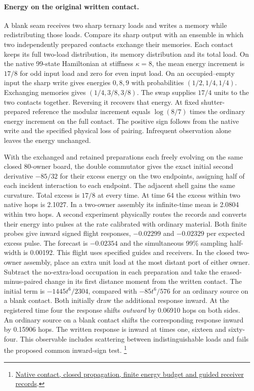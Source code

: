 \documentclass[11pt]{article}
\begin{document}
\paragraph{Energy on the original written contact.}
A blank seam receives two sharp ternary loads and writes a memory while
redistributing those loads. Compare its sharp output with an ensemble
in which two independently prepared contacts exchange their memories.
Each contact keeps its full two-load distribution, its memory distribution
and its total load. On the native 99-state Hamiltonian at stiffness
$\kappa=8$, the mean energy increment is $17/8$ for odd input load
and zero for even input load. On an occupied--empty input the sharp
write gives energies $0,8,9$ with probabilities $(1/2,1/4,1/4)$.
Exchanging memories gives $(1/4,3/8,3/8)$. The swap supplies $17/4$
units to the two contacts together. Reversing it recovers that energy.
At fixed shutter-prepared reference the modular increment equals
$\log(8/7)$ times the ordinary energy increment on the full contact.
The positive sign follows from the native write and the specified physical
loss of pairing. Infrequent observation alone leaves the energy unchanged.

With the exchanged and retained preparations each freely evolving on the
same closed 80-owner board, the double commutator gives the exact initial
second derivative $-85/32$ for their excess energy on the two endpoints,
assigning half of each incident interaction to each endpoint. The adjacent
shell gains the same curvature. Total excess is $17/8$ at every time.
At time 64 the excess within two native hops is 2.1027. In a two-owner
assembly its infinite-time mean is 2.0804 within two hops. A second
experiment physically routes the records and converts their energy into
pulses at the rate calibrated with ordinary material. Both finite probes
give inward signed flight responses, $-0.02299$ and $-0.02329$ per
expected excess pulse. The forecast is $-0.02354$ and the simultaneous
99\% sampling half-width is 0.00192. This flight uses specified guides
and receivers. In the closed two-owner assembly, place an extra unit
load at the most distant port of either owner. Subtract the no-extra-load
occupation in each preparation and take the erased-minus-paired change
in its first distance moment from the written contact. The initial term
is $-1445t^6/2304$, compared with $-85t^6/576$ for an ordinary source
on a blank contact. Both initially draw the additional response inward.
At the registered time
four the response shifts \emph{outward} by 0.06910 hops on both sides.
An ordinary source on a blank contact shifts the corresponding response
inward by 0.15906 hops. The written response is inward at times one,
sixteen and sixty-four. This observable includes scattering between
indistinguishable loads and fails the proposed common inward-sign test.%
\footnote{\href{https://github.com/FloatingPragma/observer-patch-holography/tree/main/model/experiments/interval_echo_shell_flux/product_address/green_response/material_recoil/overlap_source/native_boundary}{Native contact, closed propagation, finite energy budget and guided receiver records}.}
\end{document}
